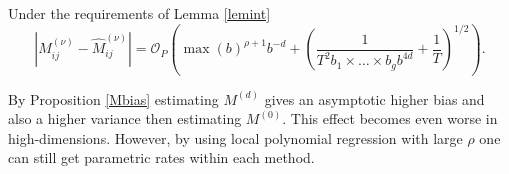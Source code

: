 \begin{proposition}
\label{Mbias}
Under the requirements of Lemma \ref{lemint} %
\[|M^{(\nu)}_{ij} - \hat{M}^{(\nu)}_{ij}|=\mathcal{O}_P\left( \max(b)^{\rho+1} b^{-d}  + \left( \frac{1}{T^2 b_1 \times \dots \times b_g  b^{4d}   }+ \frac{1}{T}\right)^{1/2}\right) .\]
\end{proposition}
By Proposition \ref{Mbias} estimating $M^{(d)}$ gives an asymptotic higher bias and also a higher variance then estimating $M^{(0)}$. This effect becomes even worse in high-dimensions. However, by using local polynomial regression with large $\rho$ one can still get parametric rates within each method. %


